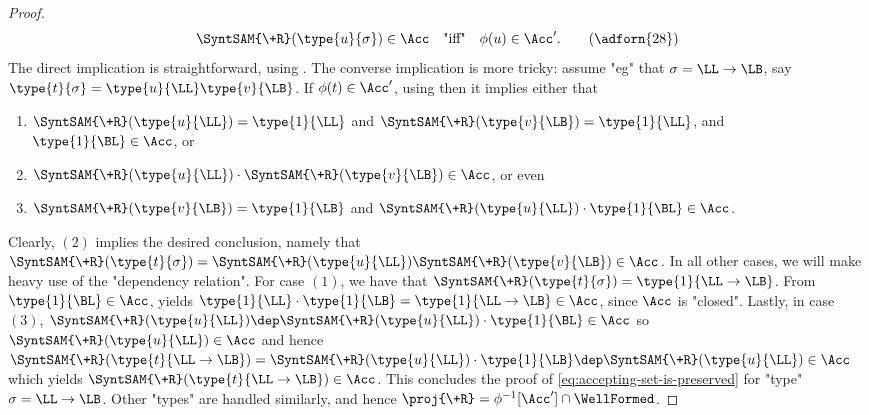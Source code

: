 \begin{proof}
\begin{equation}
		\SyntSAM{\+R}(\type{u}{\sigma}) \in \Acc
		\quad\text{"iff"}\quad
		\phi(u) \in \Acc'.
		\label{eq:accepting-set-is-preserved}
		\tag{\adforn{28}}
	\end{equation}
	The direct implication is straightforward, using
	.
	The converse implication is more tricky: assume "eg" that $\sigma = \LL\to\LB$,
	say $\type{t}{\sigma} = \type{u}{\LL}\type{v}{\LB}$.
	If $\phi(t) \in \Acc'$, using  then it implies either that
	\begin{enumerate}
		\item $\SyntSAM{\+R}(\type{u}{\LL}) = \type{1}{\LL}$ and $\SyntSAM{\+R}(\type{v}{\LB}) = \type{1}{\LL}$, and $\type{1}{\BL} \in \Acc$, or
		\item $\SyntSAM{\+R}(\type{u}{\LL})\cdot \SyntSAM{\+R}(\type{v}{\LB}) \in \Acc$, or even
		\item $\SyntSAM{\+R}(\type{v}{\LB}) = \type{1}{\LB}$ and
			$\SyntSAM{\+R}(\type{u}{\LL})\cdot \type{1}{\BL} \in \Acc$.
	\end{enumerate}
	Clearly, $(2)$ implies the desired conclusion, namely that $\SyntSAM{\+R}(\type{t}{\sigma}) = \SyntSAM{\+R}(\type{u}{\LL})\SyntSAM{\+R}(\type{v}{\LB}) \in \Acc$.
	In all other cases, we will make heavy use of the "dependency relation".
	For case $(1)$, we have that $\SyntSAM{\+R}(\type{t}{\sigma}) = \type{1}{\LL\to\LB}$.
	From $\type{1}{\BL} \in \Acc$,  yields $\type{1}{\LL} \cdot \type{1}{\LB} = \type{1}{\LL\to\LB} \in \Acc$, since $\Acc$ is "closed".
	Lastly, in case $(3)$, $\SyntSAM{\+R}(\type{u}{\LL}) \dep
	\SyntSAM{\+R}(\type{u}{\LL})\cdot \type{1}{\BL} \in \Acc$ so
	$\SyntSAM{\+R}(\type{u}{\LL}) \in \Acc$ and hence
	$\SyntSAM{\+R}(\type{t}{\LL\to\LB}) = \SyntSAM{\+R}(\type{u}{\LL}) \cdot \type{1}{\LB}
	\dep \SyntSAM{\+R}(\type{u}{\LL}) \in \Acc$ which yields
	$\SyntSAM{\+R}(\type{t}{\LL\to\LB}) \in \Acc$. This concludes the proof
	of \eqref{eq:accepting-set-is-preserved} for "type" $\sigma = \LL\to\LB$.
	Other "types" are handled similarly, and hence
	$\proj{\+R} = \phi^{-1}[\Acc']\cap\WellFormed$.
\end{proof}

